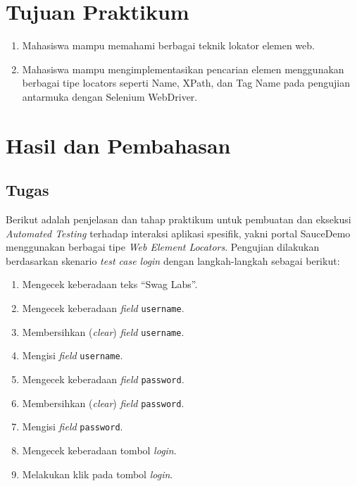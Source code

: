 \documentclass[a4paper,oneside,12pt]{report}
\newcommand{\tocboldsection}[1]{%
  \protect\renewcommand{\protect\cftchapfont}{\protect\bfseries}%
  #1%
  \protect\renewcommand{\protect\cftchapfont}{}%
}
\begin{document}
\chapter[Tujuan Praktikum]{Tujuan Praktikum}
\begin{enumerate}
    \item Mahasiswa mampu memahami berbagai teknik lokator elemen web.
    \item Mahasiswa mampu mengimplementasikan pencarian elemen menggunakan berbagai tipe locators seperti Name, XPath, dan Tag Name pada pengujian antarmuka dengan Selenium WebDriver.
\end{enumerate}
\clearpage

\chapter[\texorpdfstring{\tocboldsection{Hasil dan Pembahasan}}{Hasil dan Pembahasan}]{Hasil dan Pembahasan}

\section{Tugas}

Berikut adalah penjelasan dan tahap praktikum untuk pembuatan dan eksekusi \textit{Automated Testing} terhadap interaksi aplikasi spesifik, yakni portal SauceDemo menggunakan berbagai tipe \textit{Web Element Locators}. Pengujian dilakukan berdasarkan skenario \textit{test case login} dengan langkah-langkah sebagai berikut:

\begin{enumerate}
    \item Mengecek keberadaan teks ``Swag Labs''.
    \item Mengecek keberadaan \textit{field} \texttt{username}.
    \item Membersihkan (\textit{clear}) \textit{field} \texttt{username}.
    \item Mengisi \textit{field} \texttt{username}.
    \item Mengecek keberadaan \textit{field} \texttt{password}.
    \item Membersihkan (\textit{clear}) \textit{field} \texttt{password}.
    \item Mengisi \textit{field} \texttt{password}.
    \item Mengecek keberadaan tombol \textit{login}.
    \item Melakukan klik pada tombol \textit{login}.
\end{enumerate}
\end{document}
